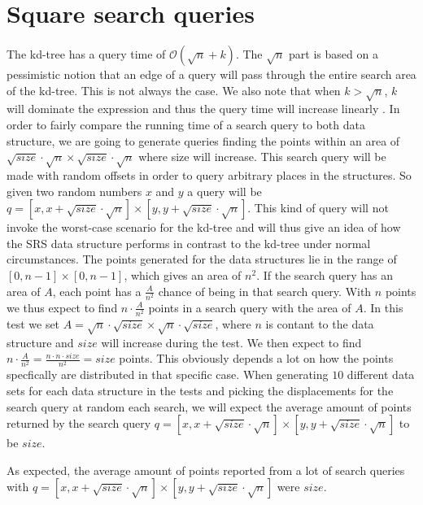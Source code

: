 \section{Square search queries}

The kd-tree has a query time of $\mathcal{O}(\sqrt{n}+k)$. The $\sqrt{n}$ part is based on a pessimistic notion that an edge of a query will pass through the entire search area of the kd-tree. This is not always the case. We also note that when $k > \sqrt{n}$, $k$ will dominate the expression and thus the query time will increase linearly . In order to fairly compare the running time of a search query to both data structure, we are going to generate queries finding the points within an area of $\sqrt{size}\cdot\sqrt{n} \times \sqrt{size}\cdot\sqrt{n}$ where size will increase. This search query will be made with random offsets in order to query arbitrary places in the structures. So given two random numbers $x$ and $y$ a query will be $q = [x, x+\sqrt{size}\cdot\sqrt{n}] \times [y, y+\sqrt{size}\cdot\sqrt{n}]$. This kind of query will not invoke the worst-case scenario for the kd-tree and will thus give an idea of how the SRS data structure performs in contrast to the kd-tree under normal circumstances. The points generated for the data structures lie in the range of $[0,n-1] \times [0,n-1]$, which gives an area of $n^2$. If the search query has an area of $A$, each point has a $\frac{A}{n^2}$ chance of being in that search query. With $n$ points we thus expect to find $n\cdot \frac{A}{n^2}$ points in a search query with the area of $A$. In this test we set $A = \sqrt{n}\cdot\sqrt{size}\times\sqrt{n}\cdot\sqrt{size}$, where $n$ is contant to the data structure and $size$ will increase during the test. We then expect to find $n\cdot\frac{A}{n^2} = \frac{n\cdot n \cdot size}{n^2} = size$ points. This obviously depends a lot on how the points specfically are distributed in that specific case. When generating $10$ different data sets for each data structure in the tests and picking the displacements for the search query at random each search, we will expect the average amount of points returned by the search query $q = [x, x+\sqrt{size}\cdot\sqrt{n}] \times [y, y+\sqrt{size}\cdot\sqrt{n}]$ to be $size$.


As expected, the average amount of points reported from a lot of search queries with $q = [x, x + \sqrt{size}\cdot\sqrt{n}] \times [y, y + \sqrt{size}\cdot\sqrt{n}]$ were $size$.

